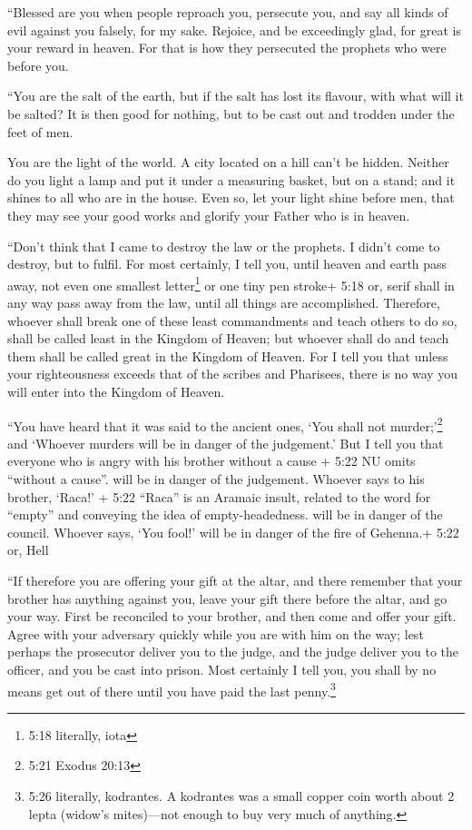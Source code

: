  ``Blessed are you when people reproach you, persecute you,
and say all kinds of evil against you falsely, for my sake.
 Rejoice, and be exceedingly glad, for great is your reward
in heaven. For that is how they persecuted the prophets who were before
you.

 ``You are the salt of the earth, but if the salt has lost
its flavour, with what will it be salted? It is then good for nothing,
but to be cast out and trodden under the feet of men.

 You are the light of the world. A city located on a hill
can't be hidden.  Neither do you light a lamp and put it
under a measuring basket, but on a stand; and it shines to all who are
in the house.  Even so, let your light shine before men,
that they may see your good works and glorify your Father who is in
heaven.

 ``Don't think that I came to destroy the law or the
prophets. I didn't come to destroy, but to fulfil.  For
most certainly, I tell you, until heaven and earth pass away, not even
one smallest letter\footnote{5:18 literally, iota} or one tiny pen
stroke+ 5:18 or, serif shall in any way pass away from the law, until
all things are accomplished.  Therefore, whoever shall
break one of these least commandments and teach others to do so, shall
be called least in the Kingdom of Heaven; but whoever shall do and teach
them shall be called great in the Kingdom of Heaven.  For I
tell you that unless your righteousness exceeds that of the scribes and
Pharisees, there is no way you will enter into the Kingdom of Heaven.

 ``You have heard that it was said to the ancient ones,
`You shall not murder;'\footnote{5:21 Exodus 20:13} and `Whoever murders
will be in danger of the judgement.'  But I tell you that
everyone who is angry with his brother without a cause + 5:22 NU omits
``without a cause''. will be in danger of the judgement. Whoever says to
his brother, `Raca!' + 5:22 ``Raca'' is an Aramaic insult, related to
the word for ``empty'' and conveying the idea of empty-headedness. will
be in danger of the council. Whoever says, `You fool!' will be in danger
of the fire of Gehenna.+ 5:22 or, Hell

 ``If therefore you are offering your gift at the altar,
and there remember that your brother has anything against you,
 leave your gift there before the altar, and go your way.
First be reconciled to your brother, and then come and offer your gift.
 Agree with your adversary quickly while you are with him
on the way; lest perhaps the prosecutor deliver you to the judge, and
the judge deliver you to the officer, and you be cast into prison.
 Most certainly I tell you, you shall by no means get out
of there until you have paid the last penny.\footnote{5:26 literally,
  kodrantes. A kodrantes was a small copper coin worth about 2 lepta
  (widow's mites)---not enough to buy very much of anything.}

